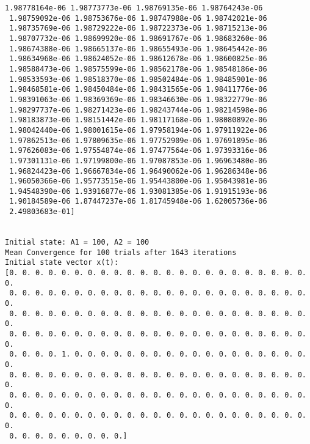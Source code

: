 \documentclass[11pt]{article}
\begin{document}
\begin{Verbatim}[commandchars=\\\{\}]
 1.98778164e-06 1.98773773e-06 1.98769135e-06 1.98764243e-06
 1.98759092e-06 1.98753676e-06 1.98747988e-06 1.98742021e-06
 1.98735769e-06 1.98729222e-06 1.98722373e-06 1.98715213e-06
 1.98707732e-06 1.98699920e-06 1.98691767e-06 1.98683260e-06
 1.98674388e-06 1.98665137e-06 1.98655493e-06 1.98645442e-06
 1.98634968e-06 1.98624052e-06 1.98612678e-06 1.98600825e-06
 1.98588473e-06 1.98575599e-06 1.98562178e-06 1.98548186e-06
 1.98533593e-06 1.98518370e-06 1.98502484e-06 1.98485901e-06
 1.98468581e-06 1.98450484e-06 1.98431565e-06 1.98411776e-06
 1.98391063e-06 1.98369369e-06 1.98346630e-06 1.98322779e-06
 1.98297737e-06 1.98271423e-06 1.98243744e-06 1.98214598e-06
 1.98183873e-06 1.98151442e-06 1.98117168e-06 1.98080892e-06
 1.98042440e-06 1.98001615e-06 1.97958194e-06 1.97911922e-06
 1.97862513e-06 1.97809635e-06 1.97752909e-06 1.97691895e-06
 1.97626083e-06 1.97554874e-06 1.97477564e-06 1.97393316e-06
 1.97301131e-06 1.97199800e-06 1.97087853e-06 1.96963480e-06
 1.96824423e-06 1.96667834e-06 1.96490062e-06 1.96286348e-06
 1.96050366e-06 1.95773515e-06 1.95443800e-06 1.95043981e-06
 1.94548390e-06 1.93916877e-06 1.93081385e-06 1.91915193e-06
 1.90184589e-06 1.87447237e-06 1.81745948e-06 1.62005736e-06
 2.49803683e-01]


Initial state: A1 = 100, A2 = 100
Mean Convergence for 100 trials after 1643 iterations
Initial state vector x(t):
[0. 0. 0. 0. 0. 0. 0. 0. 0. 0. 0. 0. 0. 0. 0. 0. 0. 0. 0. 0. 0. 0. 0. 0.
 0. 0. 0. 0. 0. 0. 0. 0. 0. 0. 0. 0. 0. 0. 0. 0. 0. 0. 0. 0. 0. 0. 0. 0.
 0. 0. 0. 0. 0. 0. 0. 0. 0. 0. 0. 0. 0. 0. 0. 0. 0. 0. 0. 0. 0. 0. 0. 0.
 0. 0. 0. 0. 0. 0. 0. 0. 0. 0. 0. 0. 0. 0. 0. 0. 0. 0. 0. 0. 0. 0. 0. 0.
 0. 0. 0. 0. 1. 0. 0. 0. 0. 0. 0. 0. 0. 0. 0. 0. 0. 0. 0. 0. 0. 0. 0. 0.
 0. 0. 0. 0. 0. 0. 0. 0. 0. 0. 0. 0. 0. 0. 0. 0. 0. 0. 0. 0. 0. 0. 0. 0.
 0. 0. 0. 0. 0. 0. 0. 0. 0. 0. 0. 0. 0. 0. 0. 0. 0. 0. 0. 0. 0. 0. 0. 0.
 0. 0. 0. 0. 0. 0. 0. 0. 0. 0. 0. 0. 0. 0. 0. 0. 0. 0. 0. 0. 0. 0. 0. 0.
 0. 0. 0. 0. 0. 0. 0. 0. 0.]



\end{Verbatim}
\end{document}
